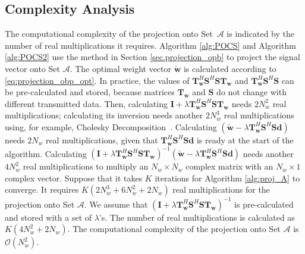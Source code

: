 \documentclass[paper]{ieice}
\begin{document}
\subsection{Complexity Analysis} \label{sec:POCS_complexity analysis}

The computational complexity of the projection onto Set~$\mathcal{A}$ is indicated by the number of real multiplications it requires. Algorithm \ref{alg:POCS} and Algorithm \ref{alg:POCS2} use the method in Section \ref{sec.projection_opb} to project the signal vector onto Set $\mathcal{A}$.  The optimal weight vector $\check{\mathbf{w}}$ is calculated according to \eqref{eq:projection_obp_opt}.  In practice, the values of $\mathbf{T}_{\mathbf{w}}^H\mathbf{S}^H\mathbf{S}\mathbf{T}_{\mathbf{w}}$ and $\mathbf{T}_{\mathbf{w}}^H\mathbf{S}^H\mathbf{S}$ can be pre-calculated and stored, because matrices $\mathbf{T}_{\mathbf{w}}$ and $\mathbf{S}$ do not change with different transmitted data. Then, calculating $\mathbf{I}+\lambda\mathbf{T}_{\mathbf{w}}^H\mathbf{S}^H\mathbf{S}\mathbf{T}_{\mathbf{w}}$ needs $2N_w^2$ real multiplications; calculating its inversion needs another $2N_w^3$ real multiplications using, for example, Cholesky Decomposition~\cite{krishnamoorthy2013matrix}.  Calculating $(\check{\mathbf{w}} -\lambda \mathbf{T}_{\mathbf{w}}^H\mathbf{S}^H\mathbf{S}\mathbf{d})$ needs $2N_w$ real multiplications, given that $\mathbf{T}_{\mathbf{w}}^H\mathbf{S}^H\mathbf{S}\mathbf{d}$ is ready at the start of the algorithm.  Calculating $(\mathbf{I}+\lambda\mathbf{T}_{\mathbf{w}}^H\mathbf{S}^H\mathbf{S}\mathbf{T}_{\mathbf{w}})^{-1}(\check{\mathbf{w}} -\lambda \mathbf{T}_{\mathbf{w}}^H\mathbf{S}^H\mathbf{S}\mathbf{d})$ needs another $4N_w^2$ real multiplications to multiply an $N_w \times N_w$ complex matrix with an $N_w \times 1$ complex vector.  Suppose that it takes $K$ iterations for Algorithm \ref{alg:proj_A} to converge.  It requires $K (2N_w^3 + 6N_w^2 + 2N_w)$ real multiplications for the projection onto Set $\mathcal{A}$. We assume that $(\mathbf{I}+\lambda\mathbf{T}_{\mathbf{w}}^H\mathbf{S}^H\mathbf{S}\mathbf{T}_{\mathbf{w}})^{-1}$ is pre-calculated and stored with a set of $\lambda$'s.  The number of real multiplications is calculated as $K(4N_w^2 + 2N_w)$. The computational complexity of the projection onto Set $\mathcal{A}$ is $\mathcal{O}(N_w^2)$.
\end{document}
